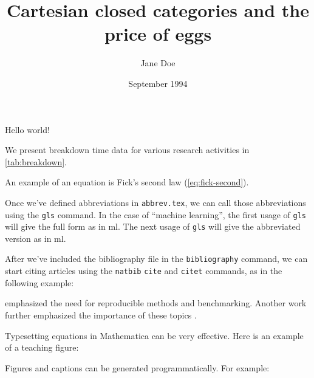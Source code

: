 \documentclass[preprint,12pt]{elsarticle}
\title{Cartesian closed categories and the price of eggs}
\author{Jane Doe}
\date{September 1994}
\begin{document}
   \maketitle
   Hello world!

We present breakdown time data for various research activities in \cref{tab:breakdown}.


An example of an equation is Fick's second law (\cref{eq:fick-second}).


Once we've defined abbreviations in \texttt{abbrev.tex}, we can call those abbreviations using the \texttt{gls} command. In the case of ``machine learning'', the first usage of \texttt{gls} will give the full form as in \gls{ml}. The next usage of \texttt{gls} will give the abbreviated version as in \gls{ml}.

After we've included the bibliography file in the \texttt{bibliography} command, we can start citing articles using the \texttt{natbib} \texttt{cite} and \texttt{citet} commands, as in the following example:

\citet{wangMachineLearningMaterials2020a} emphasized the need for reproducible methods and benchmarking. Another work further emphasized the importance of these topics \cite{barnardBestPracticeLeads2020}.

Typesetting equations in Mathematica can be very effective. Here is an example of a teaching figure: \\ %

\resizebox{.9\hsize}{!}{}

Figures and captions can be generated programmatically. For example:



\printglossaries



\end{document}
